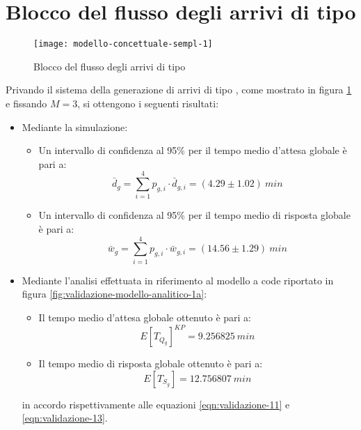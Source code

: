\section{Blocco del flusso degli arrivi di tipo \sr{}}\label{sec:validazione-blocco-sr}
\begin{figure}[ht]
\centering
\texttt{[image: modello-concettuale-sempl-1]}
\caption{Blocco del flusso degli arrivi di tipo \sr{}}
\label{fig:validazione-semplificazione-1}
\end{figure}
Privando il sistema della generazione di arrivi di tipo \sr{}, come mostrato in figura \ref{fig:validazione-semplificazione-1} e fissando $M=3$, si ottengono i seguenti risultati:
\begin{itemize}
\item Mediante la simulazione:
\begin{itemize}
\item Un intervallo di confidenza al 95\% per il tempo medio d'attesa globale è pari a:
\begin{equation} 
\bar{d}_g = \sum_{i = 1}^4 p_{g,i}\cdot \bar{d}_{g,i} = (4.29 \pm 1.02)\ min
\end{equation}
\item Un intervallo di confidenza al 95\% per il tempo medio di risposta globale è pari a:
\begin{equation}
\bar{w}_g = \sum_{i = 1}^4 p_{g,i}\cdot \bar{w}_{g,i} = (14.56 \pm 1.29)\ min
\end{equation}
\end{itemize}

\item Mediante l'analisi effettuata in riferimento al modello a code riportato in figura \ref{fig:validazione-modello-analitico-1a}:
\begin{itemize}
\item Il tempo medio d'attesa globale ottenuto è pari a:
\begin{equation}
E[T_{Q_g}]^{KP} = 9.256825\ min 
\end{equation}
\item Il tempo medio di risposta globale ottenuto è pari a:
\begin{equation}
E[T_{S_g}] = 12.756807\ min 
\end{equation}
\end{itemize}
in accordo rispettivamente alle equazioni \ref{eqn:validazione-11} e \ref{eqn:validazione-13}.
\end{itemize}


